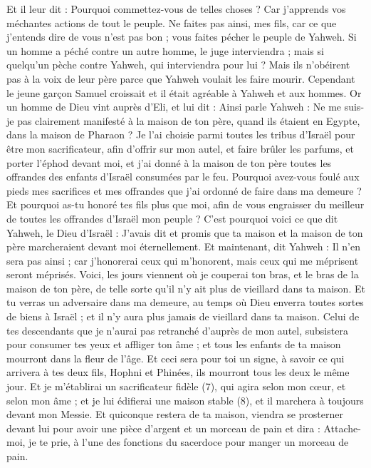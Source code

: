 \begin{multicols}{2}
Et il leur dit : Pourquoi commettez-vous de telles choses ? Car j'apprends vos méchantes actions de tout le peuple.
Ne faites pas ainsi, mes fils, car ce que j'entends dire de vous n'est pas bon ; vous faites pécher le peuple de Yahweh.
Si un homme a péché contre un autre homme, le juge interviendra ; mais si quelqu'un pèche contre Yahweh, qui interviendra pour lui ? Mais ils n'obéirent pas à la voix de leur père parce que Yahweh voulait les faire mourir.
Cependant le jeune garçon Samuel croissait et il était agréable à Yahweh et aux hommes.
Or un homme de Dieu vint auprès d’Eli, et lui dit : Ainsi parle Yahweh : Ne me suis-je pas clairement manifesté à la maison de ton père, quand ils étaient en Egypte, dans la maison de Pharaon ?
Je l'ai choisie parmi toutes les tribus d'Israël pour être mon sacrificateur, afin d'offrir sur mon autel, et faire brûler les parfums, et porter l'éphod devant moi, et j'ai donné à la maison de ton père toutes les offrandes des enfants d'Israël consumées par le feu.
Pourquoi avez-vous foulé aux pieds mes sacrifices et mes offrandes que j'ai ordonné de faire dans ma demeure ? Et pourquoi as-tu honoré tes fils plus que moi, afin de vous engraisser du meilleur de toutes les offrandes d'Israël mon peuple ?
C'est pourquoi voici ce que dit Yahweh, le Dieu d'Israël : J'avais dit et promis que ta maison et la maison de ton père marcheraient devant moi éternellement. Et maintenant, dit Yahweh : Il n’en sera pas ainsi ; car j'honorerai ceux qui m'honorent, mais ceux qui me méprisent seront méprisés.
Voici, les jours viennent où je couperai ton bras, et le bras de la maison de ton père, de telle sorte qu'il n'y ait plus de vieillard dans ta maison.
Et tu verras un adversaire dans ma demeure, au temps où Dieu enverra toutes sortes de biens à Israël ; et il n'y aura plus jamais de vieillard dans ta maison.
Celui de tes descendants que je n'aurai pas retranché d'auprès de mon autel, subsistera pour consumer tes yeux et affliger ton âme ; et tous les enfants de ta maison mourront dans la fleur de l'âge.
Et ceci sera pour toi un signe, à savoir ce qui arrivera à tes deux fils, Hophni et Phinées, ils mourront tous les deux le même jour.
Et je m'établirai un sacrificateur fidèle (7), qui agira selon mon cœur, et selon mon âme ; et je lui édifierai une maison stable (8), et il marchera à toujours devant mon Messie.
Et quiconque restera de ta maison, viendra se prosterner devant lui pour avoir une pièce d'argent et un morceau de pain et dira : Attache-moi, je te prie, à l’une des fonctions du sacerdoce pour manger un morceau de pain.

\end{multicols}
